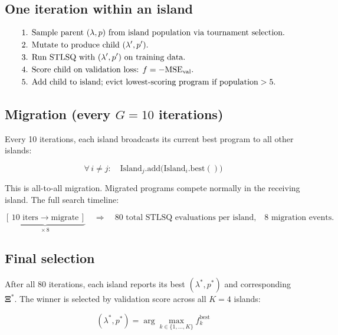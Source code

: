 \documentclass{article}
\begin{document}
\subsection*{One iteration within an island}

\begin{align}
    &\text{1. Sample parent } (\lambda, p) \text{ from island population via tournament selection.} \notag\\
    &\text{2. Mutate to produce child } (\lambda', p'). \notag\\
    &\text{3. Run STLSQ with } (\lambda', p') \text{ on training data.} \notag\\
    &\text{4. Score child on validation loss: } f = -\text{MSE}_{\text{val}}. \notag\\
    &\text{5. Add child to island; evict lowest-scoring program if population} > 5. \notag
\end{align}

\subsection*{Migration (every $G = 10$ iterations)}

Every 10 iterations, each island broadcasts its current best program to all other islands:

\begin{equation}
    \forall\, i \neq j : \quad
    \text{Island}_j.\text{add}\!\bigl(\text{Island}_i.\text{best}()\bigr)
\end{equation}

This is all-to-all migration. Migrated programs compete normally in the receiving island.
The full search timeline:

\begin{equation}
    \underbrace{[\,\text{10 iters} \to \text{migrate}\,]}_{\times\, 8}
    \quad\Rightarrow\quad
    \text{80 total STLSQ evaluations per island,}\quad
    8 \text{ migration events.}
\end{equation}

\subsection*{Final selection}

After all 80 iterations, each island reports its best $(\lambda^*, p^*)$ and corresponding $\boldsymbol{\Xi}^*$.
The winner is selected by validation score across all $K = 4$ islands:

\begin{equation}
    (\lambda^*, p^*) = \arg\max_{k \in \{1,\ldots,K\}} f_k^{\text{best}}
\end{equation}
\end{document}
